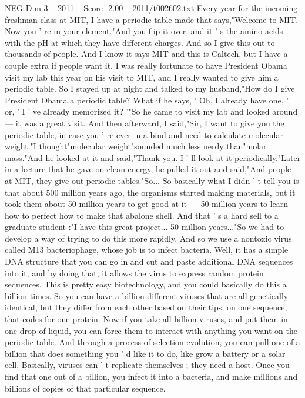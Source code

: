 \begin{textsample}{NEG Dim 3 – 2011 – Score -2.00 – 2011/t002602.txt}
Every year for the incoming freshman class at MIT, I have a periodic table made that says,"Welcome to MIT.
Now you ' re in your element."And you flip it over, and it ' s the amino acids with the pH at which they have different charges.
And so I give this out to thousands of people.
And I know it says MIT and this is Caltech, but I have a couple extra if people want it.
I was really fortunate to have President Obama visit my lab this year on his visit to MIT, and I really wanted to give him a periodic table.
So I stayed up at night and talked to my husband,"How do I give President Obama a periodic table?
What if he says, ' Oh, I already have one, ' or, ' I ' ve already memorized it? '"So he came to visit my lab and looked around — it was a great visit.
And then afterward, I said,"Sir, I want to give you the periodic table, in case you ' re ever in a bind and need to calculate molecular weight."I thought"molecular weight"sounded much less nerdy than"molar mass."And he looked at it and said,"Thank you.
I ' ll look at it periodically."Later in a lecture that he gave on clean energy, he pulled it out and said,"And people at MIT, they give out periodic tables."So...
So basically what I didn ' t tell you is that about 500 million years ago, the organisms started making materials, but it took them about 50 million years to get good at it — 50 million years to learn how to perfect how to make that abalone shell.
And that ' s a hard sell to a graduate student :"I have this great project... 50 million years..."So we had to develop a way of trying to do this more rapidly.
And so we use a nontoxic virus called M13 bacteriophage, whose job is to infect bacteria.
Well, it has a simple DNA structure that you can go in and cut and paste additional DNA sequences into it, and by doing that, it allows the virus to express random protein sequences.
This is pretty easy biotechnology, and you could basically do this a billion times.
So you can have a billion different viruses that are all genetically identical, but they differ from each other based on their tips, on one sequence, that codes for one protein.
Now if you take all billion viruses, and put them in one drop of liquid, you can force them to interact with anything you want on the periodic table.
And through a process of selection evolution, you can pull one of a billion that does something you ' d like it to do, like grow a battery or a solar cell.
Basically, viruses can ' t replicate themselves ; they need a host.
Once you find that one out of a billion, you infect it into a bacteria, and make millions and billions of copies of that particular sequence.

\end{textsample}
